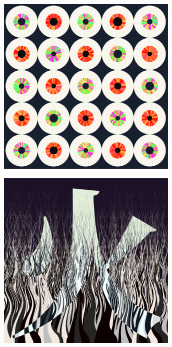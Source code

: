 \documentclass[11pt,twoside]{book}
\begin{document}
\begin{figure}[!ht]
\includegraphics[width=246pt]{candy-d89e78fa-58b5-4572-aed3-47fe37d9ef93.png}
\end{figure}
\newpage
{}
\fancyfoot[CE,CO]{\fontsize{10}{12}\selectfont \thepage}
\begin{figure}[!ht]
\includegraphics[width=246pt]{warm-bw-90bd7ba2-2eaa-4579-a305-98c1de664277.png}
\end{figure}
\newpage
{}
\fancyfoot[CE,CO]{\fontsize{10}{12}\selectfont \thepage}
\end{document}
